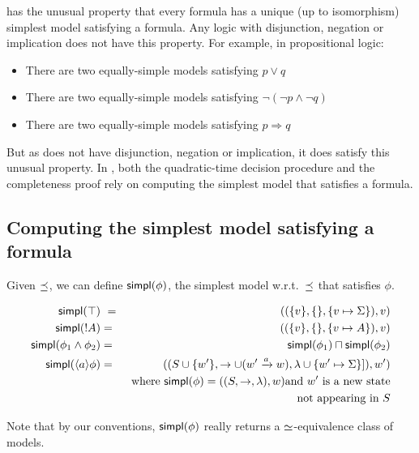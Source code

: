 \Cathoristic{} has the unusual property that every formula has a
unique (up to isomorphism) simplest model satisfying a formula.  Any
logic with disjunction, negation or implication does not have this
property.  For example, in propositional logic:
\begin{itemize}
\item
There are two equally-simple models satisfying $p \lor q$
\item
There are two equally-simple  models satisfying $\neg (\neg p \land \neg q)$
\item
There are two equally-simple models satisfying $p \Rightarrow q$
\end{itemize}
But as \cathoristic{} does not have disjunction, negation or implication, it does satisfy this unusual property.
In \cathoristic{}, both the quadratic-time decision procedure and the completeness proof rely on computing the simplest model that satisfies a formula. 

\subsection{Computing the simplest model satisfying a formula}
\label{simpl}

Given $\preceq $, we can define $\mathsf{simpl}(\phi)$, the simplest model w.r.t.~$\preceq $ that
satisfies $\phi$.

\begin{eqnarray*}
  \mathsf{simpl}(\top) &\ = \ & ( (\{v\}, \{\}, \{v \mapsto \Sigma\}), v)  \\
  \mathsf{simpl}(! A) & = & ( (\{v\}, \{\}, \{v \mapsto A\}), v)  \\
  \mathsf{simpl}(\phi_1 \land \phi_2) & = & \mathsf{simpl}(\phi_1) \sqcap \mathsf{simpl}(\phi_2)  \\
  \mathsf{simpl}(\langle a \rangle \phi) 
     & = & ( (S \cup \{w'\}, \rightarrow \cup (w' \xrightarrow{a} w), \lambda \cup \{w' \mapsto \Sigma\}]), w')  \\
		& & \mbox{where }\mathsf{simpl}(\phi) = ( (S, \rightarrow, \lambda), w) \mbox{and } w' \mbox{ is a new state} \\
                &&  \mbox{not appearing in }S 
\end{eqnarray*}





\NI Note that by our conventions, $\mathsf{simpl}(\phi)$ really returns a
$\simeq$-equivalence class of models.

